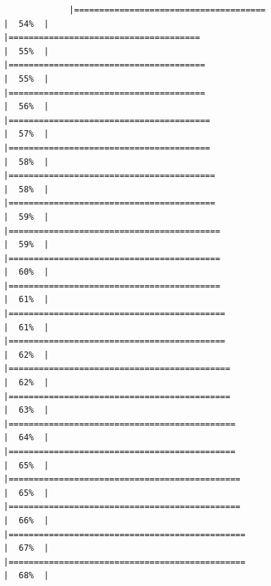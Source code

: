 \documentclass[
]{article}
\begin{document}
\begin{verbatim}
             |======================================                                |  54%  |                                                                              |======================================                                |  55%  |                                                                              |=======================================                               |  55%  |                                                                              |=======================================                               |  56%  |                                                                              |========================================                              |  57%  |                                                                              |========================================                              |  58%  |                                                                              |=========================================                             |  58%  |                                                                              |=========================================                             |  59%  |                                                                              |==========================================                            |  59%  |                                                                              |==========================================                            |  60%  |                                                                              |==========================================                            |  61%  |                                                                              |===========================================                           |  61%  |                                                                              |===========================================                           |  62%  |                                                                              |============================================                          |  62%  |                                                                              |============================================                          |  63%  |                                                                              |=============================================                         |  64%  |                                                                              |=============================================                         |  65%  |                                                                              |==============================================                        |  65%  |                                                                              |==============================================                        |  66%  |                                                                              |===============================================                       |  67%  |                                                                              |===============================================                       |  68%  |                                                                  
\end{verbatim}
\end{document}
